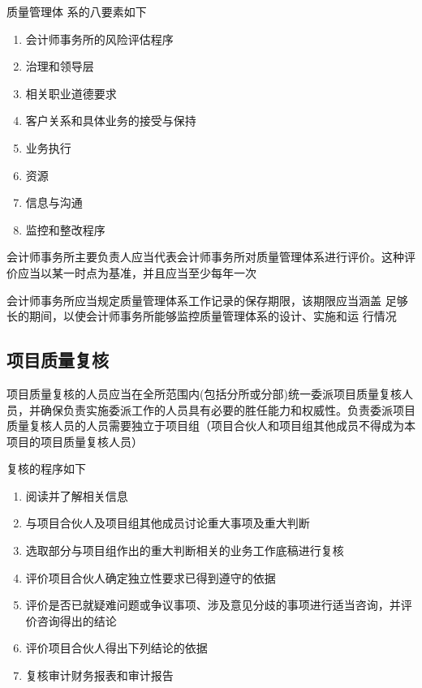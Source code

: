 \documentclass[UTF8,12pt]{ctexart}
\numberwithin{equation}{section} %
\numberwithin{figure}{section}
\numberwithin{table}{section}
\begin{document}
	质量管理体 系的八要素如下
	\begin{enumerate}
		\item 会计师事务所的风险评估程序
		
		\item 治理和领导层
		
		\item 相关职业道德要求
		
		\item 客户关系和具体业务的接受与保持
		
		\item 业务执行
		
		\item 资源
		
		\item 信息与沟通
		
		\item 监控和整改程序
	\end{enumerate}
	
	会计师事务所主要负责人应当代表会计师事务所对质量管理体系进行评价。这种评价应当以某一时点为基准，并且应当至少每年一次
	
	会计师事务所应当规定质量管理体系工作记录的保存期限，该期限应当涵盖 足够长的期间，以使会计师事务所能够监控质量管理体系的设计、实施和运 行情况
	
	\subsection{项目质量复核}
	项目质量复核的人员应当在全所范围内(包括分所或分部)统一委派项目质量复核人员，并确保负责实施委派工作的人员具有必要的胜任能力和权威性。负责委派项目质量复核人员的人员需要独立于项目组（项目合伙人和项目组其他成员不得成为本项目的项目质量复核人员）
	
	复核的程序如下
	\begin{enumerate}
		\item 阅读并了解相关信息
		
		\item 与项目合伙人及项目组其他成员讨论重大事项及重大判断
		
		\item 选取部分与项目组作出的重大判断相关的业务工作底稿进行复核
		
		\item 评价项目合伙人确定独立性要求已得到遵守的依据
		
		\item 评价是否已就疑难问题或争议事项、涉及意见分歧的事项进行适当咨询，并评价咨询得出的结论
		
		\item 评价项目合伙人得出下列结论的依据
		
		\item 复核审计财务报表和审计报告
	\end{enumerate}
	
\end{document}
